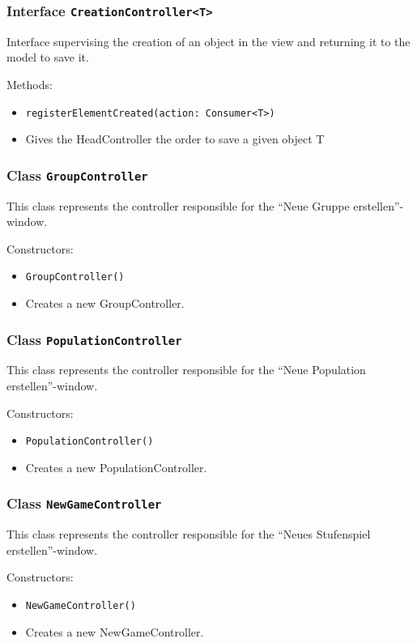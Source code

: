 \documentclass[parskip=full,11pt]{scrartcl}
\begin{document}
\subsubsection{Interface \texttt{CreationController<T>}}
Interface supervising the creation of an object in the view and returning it to the model to save it.

Methods:
\begin{itemize}\itemsep -10pt
\item \texttt{registerElementCreated(action: Consumer<T>)}
\item[] Gives the HeadController the order to save a given object T
\end{itemize}

\subsubsection{Class \texttt{GroupController}}
This class represents the controller responsible for the \enquote{Neue Gruppe erstellen}-window.

Constructors:
\begin{itemize}\itemsep -10pt
\item \texttt{GroupController()}
\item[] Creates a new GroupController.
\end{itemize}

\subsubsection{Class \texttt{PopulationController}}
This class represents the controller responsible for the \enquote{Neue Population erstellen}-window.

Constructors:
\begin{itemize}\itemsep -10pt
\item \texttt{PopulationController()}
\item[] Creates a new PopulationController.
\end{itemize}

\subsubsection{Class \texttt{NewGameController}}
This class represents the controller responsible for the \enquote{Neues Stufenspiel erstellen}-window.

Constructors:
\begin{itemize}\itemsep -10pt
\item \texttt{NewGameController()}
\item[] Creates a new NewGameController.
\end{itemize}
\end{document}

